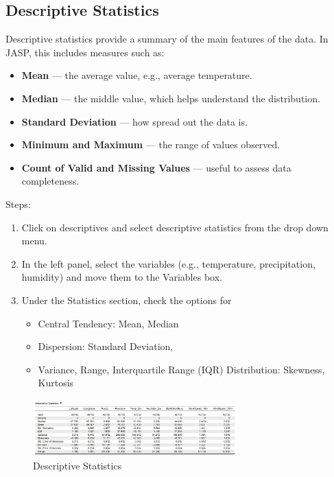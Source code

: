 \subsection{Descriptive Statistics}

Descriptive statistics provide a summary of the main features of the data. In JASP, this includes measures such as:

\begin{itemize}
    \item \textbf{Mean} — the average value, e.g., average temperature.
    \item \textbf{Median} — the middle value, which helps understand the distribution.
    \item \textbf{Standard Deviation} — how spread out the data is.
    \item \textbf{Minimum and Maximum} — the range of values observed.
    \item \textbf{Count of Valid and Missing Values} — useful to assess data completeness.
\end{itemize}

Steps:

\begin{enumerate}
    \item Click on descriptives and select descriptive statistics from the drop down menu.
    \item In the left panel, select the variables (e.g., temperature, precipitation, humidity) and move them to the Variables box.
    \item Under the Statistics section, check the options for
    \begin{itemize}
    \item Central Tendency: Mean, Median
    \item Dispersion: Standard Deviation, \item Variance, Range, Interquartile Range (IQR)
Distribution: Skewness, Kurtosis
    \end{itemize}
\end{enumerate}

\begin{figure}[h]
\centering
\includegraphics[width=0.7\textwidth]{figures/jasp_descriptivestats.png}
\caption{Descriptive Statistics}
\end{figure}

